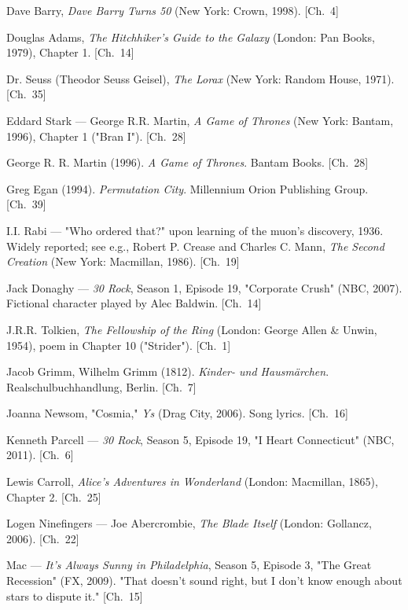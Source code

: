 \begin{list}{}{%
  \setlength{\leftmargin}{2em}%
  \setlength{\itemindent}{-2em}%
  \setlength{\itemsep}{0.35\baselineskip}%
  \setlength{\parsep}{0pt}%
  \setlength{\topsep}{0.5em}}
\item Dave Barry, \textit{Dave Barry Turns 50} (New York: Crown, 1998). \hfill {\scriptsize [Ch.~4]}
\item Douglas Adams, \textit{The Hitchhiker's Guide to the Galaxy} (London: Pan Books, 1979), Chapter 1. \hfill {\scriptsize [Ch.~14]}
\item Dr. Seuss (Theodor Seuss Geisel), \textit{The Lorax} (New York: Random House, 1971). \hfill {\scriptsize [Ch.~35]}
\item Eddard Stark — George R.R. Martin, \textit{A Game of Thrones} (New York: Bantam, 1996), Chapter 1 ("Bran I"). \hfill {\scriptsize [Ch.~28]}
\item George R. R. Martin (1996). \textit{A Game of Thrones}. Bantam Books. \hfill {\scriptsize [Ch.~28]}
\item Greg Egan (1994). \textit{Permutation City}. Millennium Orion Publishing Group. \hfill {\scriptsize [Ch.~39]}
\item I.I. Rabi — "Who ordered that?" upon learning of the muon's discovery, 1936. Widely reported; see e.g., Robert P. Crease and Charles C. Mann, \textit{The Second Creation} (New York: Macmillan, 1986). \hfill {\scriptsize [Ch.~19]}
\item Jack Donaghy — \textit{30 Rock}, Season 1, Episode 19, "Corporate Crush" (NBC, 2007). Fictional character played by Alec Baldwin. \hfill {\scriptsize [Ch.~14]}
\item J.R.R. Tolkien, \textit{The Fellowship of the Ring} (London: George Allen \& Unwin, 1954), poem in Chapter 10 ("Strider"). \hfill {\scriptsize [Ch.~1]}
\item Jacob Grimm, Wilhelm Grimm (1812). \textit{Kinder- und Hausmärchen}. Realschulbuchhandlung, Berlin. \hfill {\scriptsize [Ch.~7]}
\item Joanna Newsom, "Cosmia," \textit{Ys} (Drag City, 2006). Song lyrics. \hfill {\scriptsize [Ch.~16]}
\item Kenneth Parcell — \textit{30 Rock}, Season 5, Episode 19, "I Heart Connecticut" (NBC, 2011). \hfill {\scriptsize [Ch.~6]}
\item Lewis Carroll, \textit{Alice's Adventures in Wonderland} (London: Macmillan, 1865), Chapter 2. \hfill {\scriptsize [Ch.~25]}
\item Logen Ninefingers — Joe Abercrombie, \textit{The Blade Itself} (London: Gollancz, 2006). \hfill {\scriptsize [Ch.~22]}
\item Mac — \textit{It's Always Sunny in Philadelphia}, Season 5, Episode 3, "The Great Recession" (FX, 2009). "That doesn't sound right, but I don't know enough about stars to dispute it." \hfill {\scriptsize [Ch.~15]}

\end{list}
